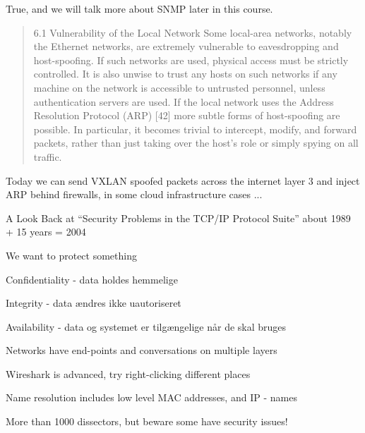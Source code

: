 \documentclass[Screen16to9,17pt]{foils}
\begin{document}
True, and we will talk more about SNMP later in this course.


\begin{quote}
6.1 Vulnerability of the Local Network
Some local-area networks, notably the Ethernet networks, are extremely vulnerable to eavesdropping and
host-spoofing. If such networks are used, physical access must be strictly controlled. It is also unwise
to trust any hosts on such networks if any machine on the network is accessible to untrusted personnel,
unless authentication servers are used.
If the local network uses the Address Resolution Protocol (ARP) [42] more subtle forms of host-spoofing
are possible. In particular, it becomes trivial to intercept, modify, and forward packets, rather than just
taking over the host’s role or simply spying on all traffic.
\end{quote}

Today we can send VXLAN spoofed packets across the internet layer 3 and inject ARP behind firewalls, in some cloud infrastructure cases ...

A Look Back at “Security Problems in the TCP/IP Protocol Suite”
about 1989 + 15 years = 2004







\begin{list1}
\item We want to protect something
\item Confidentiality - data holdes hemmelige
\item Integrity - data ændres ikke uautoriseret
\item Availability - data og systemet er tilgængelige når de skal bruges
\end{list1}





\begin{list2}
\item Networks have end-points and conversations on multiple layers
\item Wireshark is advanced, try right-clicking different places
\item Name resolution includes low level MAC addresses, and IP - names
\item More than 1000 dissectors, but beware some have security issues!
\end{list2}
\end{document}
